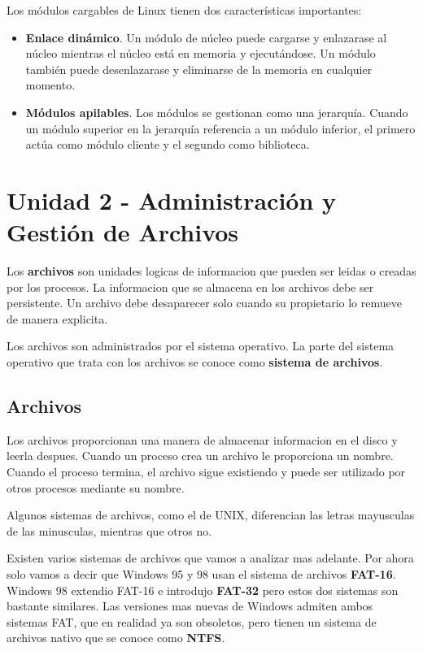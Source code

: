 \documentclass[12pt]{article}
\begin{document}
  Los módulos cargables de Linux tienen dos características importantes:
  \begin{itemize}
    \item \textbf{Enlace dinámico}. Un módulo de núcleo puede cargarse y enlazarase al núcleo mientras el núcleo está en memoria y ejecutándose. Un módulo también puede desenlazarase y eliminarse de la memoria en cualquier momento.

    \item \textbf{Módulos apilables}. Los módulos se gestionan como una jerarquía. Cuando un módulo superior en la jerarquía referencia a un módulo inferior, el primero actúa como módulo cliente y el segundo como biblioteca.
  \end{itemize}

  \section{Unidad 2 - Administración y Gestión de Archivos}
  Los \textbf{archivos} son unidades logicas de informacion que pueden ser leidas o creadas por los procesos. La informacion que se almacena en los archivos debe ser persistente. Un archivo debe desaparecer solo cuando su propietario lo remueve de manera explicita.

  Los archivos son administrados por el sistema operativo. La parte del sistema operativo que trata con los archivos se conoce como \textbf{sistema de archivos}.

  \subsection{Archivos}
  Los archivos proporcionan una manera de almacenar informacion en el disco y leerla despues. Cuando un proceso crea un archivo le proporciona un nombre. Cuando el proceso termina, el archivo sigue existiendo y puede ser utilizado por otros procesos mediante su nombre.

  Algunos sistemas de archivos, como el de UNIX, diferencian las letras mayusculas de las minusculas, mientras que otros no.

  Existen varios sistemas de archivos que vamos a analizar mas adelante. Por ahora solo vamos a decir que Windows 95 y 98 usan el sistema de archivos \textbf{FAT-16}. Windows 98 extendio FAT-16 e introdujo \textbf{FAT-32} pero estos dos sistemas son bastante similares. Las versiones mas nuevas de Windows admiten ambos sistemas FAT, que en realidad ya son obsoletos, pero tienen un sistema de archivos nativo que se conoce como \textbf{NTFS}.
\end{document}
